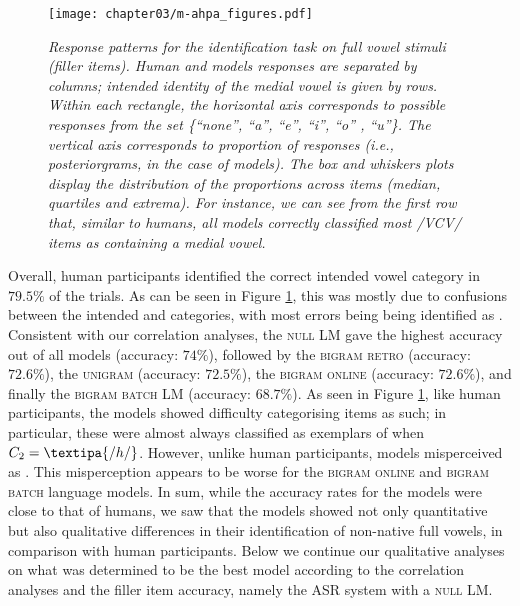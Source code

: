 {\begin{figure}[htb]
\centering
\texttt{[image: chapter03/m-ahpa\_figures.pdf]}
\caption{\textit{Response patterns for the identification task on full vowel stimuli (filler items). Human and models responses are separated by columns; intended identity of the medial vowel is given by rows. Within each rectangle, the horizontal axis corresponds to possible responses from the set \{``none'', ``a'', ``e'', ``i'', ``o'' , ``u''\}. The vertical axis corresponds to proportion of responses (i.e., posteriorgrams, in the case of models). The box and whiskers plots display the distribution of the proportions across items (median, quartiles and extrema). For instance, we can see from the first row that, similar to humans, all models correctly classified most /VCV/ items as containing a medial  vowel.}}
\label{fig:m-ahpa_fV_acc}
\end{figure}


Overall, human participants identified the correct intended vowel category in $79.5\%$ of the trials. As can be seen in Figure \ref{fig:m-ahpa_fV_acc}, this was mostly due to confusions between the intended  and  categories, with most errors being  being identified as .
Consistent with our correlation analyses, the \textsc{null} LM gave the highest accuracy out of all models (accuracy: $74\%$), followed by the \textsc{bigram retro} (accuracy: $72.6\%$), the \textsc{unigram} (accuracy: $72.5\%$), the \textsc{bigram online} (accuracy: $72.6\%$), and finally the \textsc{bigram batch} LM (accuracy: $68.7\%$). 
As seen in Figure \ref{fig:m-ahpa_fV_acc}, like human participants, the models showed difficulty categorising  items as such; in particular, these were almost always classified as exemplars of  when $C_2 = \textipa{/h/}$. However, unlike human participants, models misperceived  as . This misperception appears to be worse for the \textsc{bigram online} and \textsc{bigram batch} language models.
In sum, while the accuracy rates for the models were close to that of humans, we saw that the models showed not only quantitative but also qualitative differences in their identification of non-native full vowels, in comparison with human participants. Below we continue our qualitative analyses on what was determined to be the best model according to the correlation analyses and the filler item accuracy, namely the ASR system with a \textsc{null} LM.  

}
